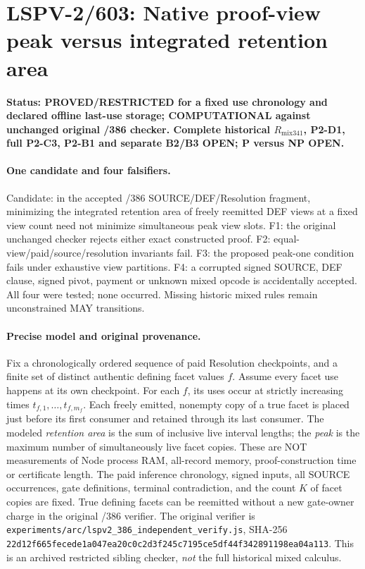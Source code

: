 \section*{LSPV-2/603: Native proof-view peak versus integrated retention area}
\textbf{Status: PROVED/RESTRICTED for a fixed use chronology and declared offline last-use storage; COMPUTATIONAL against unchanged original /386 checker. Complete historical $R_{\mathrm{mix341}}$, P2-D1, full P2-C3, P2-B1 and separate B2/B3 OPEN; P versus NP OPEN.}

\paragraph{One candidate and four falsifiers.}
Candidate: in the accepted /386 SOURCE/DEF/Resolution fragment, minimizing the integrated retention area of freely reemitted DEF views at a fixed view count need not minimize simultaneous peak view slots. F1: the original unchanged checker rejects either exact constructed proof. F2: equal-view/paid/source/resolution invariants fail. F3: the proposed peak-one condition fails under exhaustive view partitions. F4: a corrupted signed SOURCE, DEF clause, signed pivot, payment or unknown mixed opcode is accidentally accepted. All four were tested; none occurred. Missing historic mixed rules remain unconstrained MAY transitions.

\paragraph{Precise model and original provenance.}
Fix a chronologically ordered sequence of paid Resolution checkpoints, and a finite set of distinct authentic defining facet values $f$. Assume every facet use happens at its own checkpoint. For each $f$, its uses occur at strictly increasing times $t_{f,1},\ldots,t_{f,m_f}$. Each freely emitted, nonempty copy of a true facet is placed just before its first consumer and retained through its last consumer. The modeled \emph{retention area} is the sum of inclusive live interval lengths; the \emph{peak} is the maximum number of simultaneously live facet copies. These are NOT measurements of Node process RAM, all-record memory, proof-construction time or certificate length. The paid inference chronology, signed inputs, all SOURCE occurrences, gate definitions, terminal contradiction, and the count $K$ of facet copies are fixed. True defining facets can be reemitted without a new gate-owner charge in the original /386 verifier. The original verifier is \texttt{experiments/arc/lspv2\_386\_independent\_verify.js}, SHA-256 \texttt{22d12f665fecede1a047ea20c0c2d3f245c7195ce5df44f342891198ea04a113}. This is an archived restricted sibling checker, \emph{not} the full historical mixed calculus.

